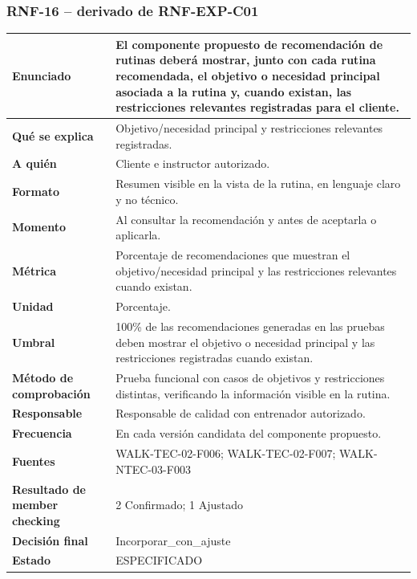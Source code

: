\documentclass[11pt,a4paper,twoside]{article}
\begin{document}
\subsubsection{RNF-16 -- derivado de RNF-EXP-C01}
\begin{tabularx}{\textwidth}{|>{\bfseries}p{4.0cm}|X|}\hline
Enunciado & El componente propuesto de recomendación de rutinas deberá mostrar, junto con cada rutina recomendada, el objetivo o necesidad principal asociada a la rutina y, cuando existan, las restricciones relevantes registradas para el cliente. \\ \hline
Qué se explica & Objetivo/necesidad principal y restricciones relevantes registradas. \\ \hline
A quién & Cliente e instructor autorizado. \\ \hline
Formato & Resumen visible en la vista de la rutina, en lenguaje claro y no técnico. \\ \hline
Momento & Al consultar la recomendación y antes de aceptarla o aplicarla. \\ \hline
Métrica & Porcentaje de recomendaciones que muestran el objetivo/necesidad principal y las restricciones relevantes cuando existan. \\ \hline
Unidad & Porcentaje. \\ \hline
Umbral & 100\% de las recomendaciones generadas en las pruebas deben mostrar el objetivo o necesidad principal y las restricciones registradas cuando existan. \\ \hline
Método de comprobación & Prueba funcional con casos de objetivos y restricciones distintas, verificando la información visible en la rutina. \\ \hline
Responsable & Responsable de calidad con entrenador autorizado. \\ \hline
Frecuencia & En cada versión candidata del componente propuesto. \\ \hline
Fuentes & WALK-TEC-02-F006; WALK-TEC-02-F007; WALK-NTEC-03-F003 \\ \hline
Resultado de member checking & 2 Confirmado; 1 Ajustado \\ \hline
Decisión final & Incorporar\_con\_ajuste \\ \hline
Estado & ESPECIFICADO \\ \hline
\end{tabularx}
\end{document}
